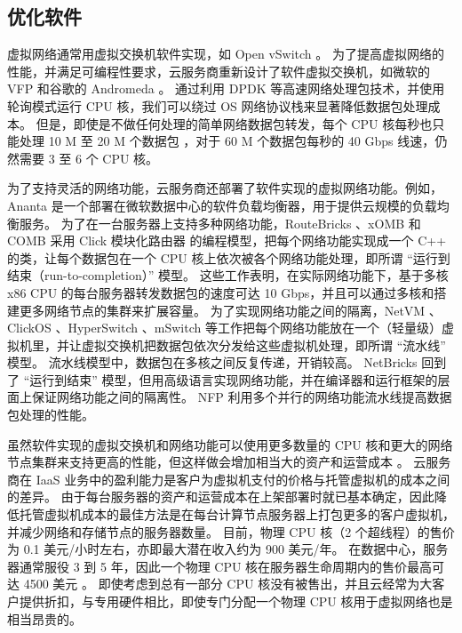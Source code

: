 \subsection{优化软件}

虚拟网络通常用虚拟交换机软件实现，如 Open vSwitch \cite{pfaff2015design}。
为了提高虚拟网络的性能，并满足可编程性要求，云服务商重新设计了软件虚拟交换机，如微软的 VFP \cite{firestone2017vfp} 和谷歌的 Andromeda \cite{andromeda}。
通过利用 DPDK \cite{dpdk} 等高速网络处理包技术，并使用轮询模式运行 CPU 核，我们可以绕过 OS 网络协议栈来显著降低数据包处理成本。
但是，即使是不做任何处理的简单网络数据包转发，每个 CPU 核每秒也只能处理 10 M 至 20 M 个数据包 \cite{martins2014clickos,netbricks}，对于 60 M 个数据包每秒的 40 Gbps 线速，仍然需要 3 至 6 个 CPU 核。

为了支持灵活的网络功能，云服务商还部署了软件实现的虚拟网络功能。例如，Ananta \cite {ananta} 是一个部署在微软数据中心的软件负载均衡器，用于提供云规模的负载均衡服务。
为了在一台服务器上支持多种网络功能，RouteBricks \cite {routebricks}、xOMB \cite{anderson2012xomb} 和 COMB \cite{comb} 采用 Click 模块化路由器 \cite{kohler2000click} 的编程模型，把每个网络功能实现成一个 C++ 的类，让每个数据包在一个 CPU 核上依次被各个网络功能处理，即所谓 ``运行到结束（run-to-completion）'' 模型。
这些工作表明，在实际网络功能下，基于多核 x86 CPU 的每台服务器转发数据包的速度可达 10 Gbps，并且可以通过多核和搭建更多网络节点的集群来扩展容量。
为了实现网络功能之间的隔离，NetVM \cite{hwang2015netvm}、ClickOS \cite{martins2014clickos}、HyperSwitch \cite{ram2013hyper}、mSwitch \cite{eisenbud2016maglev} 等工作把每个网络功能放在一个（轻量级）虚拟机里，并让虚拟交换机把数据包依次分发给这些虚拟机处理，即所谓 ``流水线'' 模型。
流水线模型中，数据包在多核之间反复传递，开销较高。
NetBricks \cite{netbricks} 回到了 ``运行到结束'' 模型，但用高级语言实现网络功能，并在编译器和运行框架的层面上保证网络功能之间的隔离性。
NFP \cite{sun2017nfp} 利用多个并行的网络功能流水线提高数据包处理的性能。

虽然软件实现的虚拟交换机和网络功能可以使用更多数量的 CPU 核和更大的网络节点集群来支持更高的性能，但这样做会增加相当大的资产和运营成本 \cite {ananta,duet}。
云服务商在 IaaS 业务中的盈利能力是客户为虚拟机支付的价格与托管虚拟机的成本之间的差异。
由于每台服务器的资产和运营成本在上架部署时就已基本确定，因此降低托管虚拟机成本的最佳方法是在每台计算节点服务器上打包更多的客户虚拟机，并减少网络和存储节点的服务器数量。
目前，物理 CPU 核（2 个超线程）的售价为 0.1 美元/小时左右，亦即最大潜在收入约为 900 美元/年。
在数据中心，服务器通常服役 3 到 5 年，因此一个物理 CPU 核在服务器生命周期内的售价最高可达 4500 美元 \cite{smartnic}。
即使考虑到总有一部分 CPU 核没有被售出，并且云经常为大客户提供折扣，与专用硬件相比，即使专门分配一个物理 CPU 核用于虚拟网络也是相当昂贵的。

